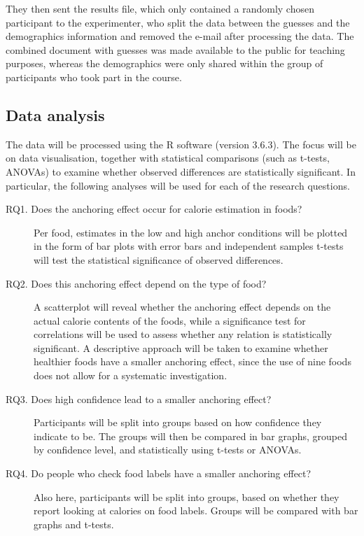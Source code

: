 \documentclass[a4paper,doc,natbib]{apa6}
\begin{document}
They then sent the results file, which only contained a randomly chosen participant to the experimenter, who split the data between the guesses and the demographics information and removed the e-mail after processing the data. The combined document with guesses was made available to the public for teaching purposes, whereas the demographics were only shared within the group of participants who took part in the course.

\subsection{Data analysis}

The data will be processed using the R software (version 3.6.3). The focus will be on data visualisation, together with statistical comparisons (such as t-tests, ANOVAs) to examine whether observed differences are statistically significant. In particular, the following analyses will be used for each of the research questions.

\begin{description}
\item[RQ1. Does the anchoring effect occur for calorie estimation in foods?] Per food, estimates in the low and high anchor conditions will be plotted in the form of bar plots with error bars and independent samples t-tests will test the statistical significance of observed differences.
\item[RQ2. Does this anchoring effect depend on the type of food?] A scatterplot will reveal whether the anchoring effect depends on the actual calorie contents of the foods, while a significance test for correlations will be used to assess whether any relation is statistically significant. A descriptive approach will be taken to examine whether healthier foods have a smaller anchoring effect, since the use of nine foods does not allow for a systematic investigation.
\item[RQ3. Does high confidence lead to a smaller anchoring effect?] Participants will be split into groups based on how confidence they indicate to be. The groups will then be compared in bar graphs, grouped by confidence level, and statistically using t-tests or ANOVAs.
\item[RQ4. Do people who check food labels have a smaller anchoring effect?] Also here, participants will be split into groups, based on whether they report looking at calories on food labels. Groups will be compared with bar graphs and t-tests.
\end{description}
\end{document}
